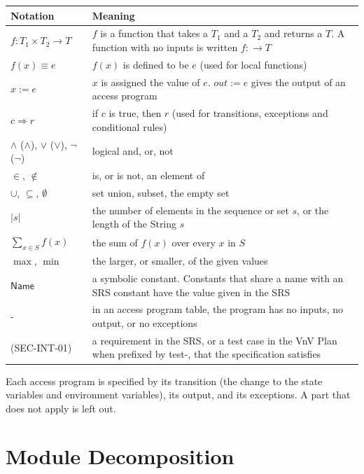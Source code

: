 \documentclass[12pt, titlepage]{article}
\begin{document}
\begin{center}
\renewcommand{\arraystretch}{1.2}
\noindent
\begin{tabular}{l p{10cm}}
\toprule
\textbf{Notation} & \textbf{Meaning}\\
\midrule
$f: T_1 \times T_2 \rightarrow T$ & $f$ is a function that takes a $T_1$ and
  a $T_2$ and returns a $T$. A function with no inputs is written $f:
  \rightarrow T$\\
$f(x) \equiv e$ & $f(x)$ is defined to be $e$ (used for local functions)\\
$x := e$ & $x$ is assigned the value of $e$. $\mathit{out} := e$ gives the
  output of an access program\\
$c \Rightarrow r$ & if $c$ is true, then $r$ (used for transitions,
  exceptions and conditional rules)\\
$\land$ ($\wedge$), $\lor$ ($\vee$), $\lnot$ ($\neg$) & logical and, or, not\\
$\in$, $\notin$ & is, or is not, an element of\\
$\cup$, $\subseteq$, $\emptyset$ & set union, subset, the empty set\\
$|s|$ & the number of elements in the sequence or set $s$, or the length of
  the String $s$\\
$\sum_{x \in S} f(x)$ & the sum of $f(x)$ over every $x$ in $S$\\
$\max$, $\min$ & the larger, or smaller, of the given values\\
$\textsf{Name}$ & a symbolic constant. Constants that share a name with an
  SRS constant have the value given in the SRS\\
- & in an access program table, the program has no inputs, no output, or no
  exceptions\\
(SEC-INT-01) & a requirement in the SRS, or a test case in the VnV Plan when
  prefixed by test-, that the specification satisfies\\
\bottomrule
\end{tabular}
\end{center}

\noindent
Each access program is specified by its transition (the change to the state
variables and environment variables), its output, and its exceptions. A part
that does not apply is left out.

\section{Module Decomposition}
\end{document}
